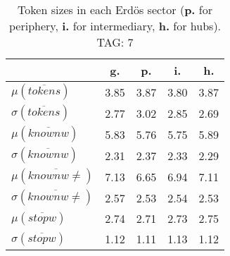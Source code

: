 \begin{table}[h!]
\begin{center}
\begin{tabular}{| l | c | c | c | c |}\hline
 & g. & p. & i. & h. \\\hline
$\mu(\overline{tokens})$ & 3.85  & 3.87  & 3.80  & 3.87 \\\hline
$\sigma(\overline{tokens})$ & 2.77  & 3.02  & 2.85  & 2.69 \\\hline
$\mu(\overline{knownw})$ & 5.83  & 5.76  & 5.75  & 5.89 \\\hline
$\sigma(\overline{knownw})$ & 2.31  & 2.37  & 2.33  & 2.29 \\\hline
$\mu(\overline{knownw \neq})$ & 7.13  & 6.65  & 6.94  & 7.11 \\\hline
$\sigma(\overline{knownw \neq})$ & 2.57  & 2.53  & 2.54  & 2.53 \\\hline
$\mu(\overline{stopw})$ & 2.74  & 2.71  & 2.73  & 2.75 \\\hline
$\sigma(\overline{stopw})$ & 1.12  & 1.11  & 1.13  & 1.12 \\\hline
\end{tabular}
\caption{Token sizes in each Erd\"os sector ({{\bf p.}} for periphery, {{\bf i.}} for intermediary, {{\bf h.}} for hubs). TAG: 7}
\end{center}
\end{table}